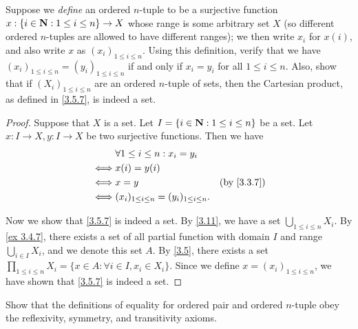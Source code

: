 \begin{exercise}\label{ex 3.5.2}
  Suppose we \emph{define} an ordered \(n\)-tuple to be a surjective function \(x : \{i \in \mathbf{N} : 1 \leq i \leq n\} \to X\) whose range is some arbitrary set \(X\) (so different ordered \(n\)-tuples are allowed to have different ranges);
  we then write \(x_i\) for \(x(i)\), and also write \(x\) as \((x_i)_{1 \leq i \leq n}\).
  Using this definition, verify that we have \((x_i)_{1 \leq i \leq n} = (y_i)_{1 \leq i \leq n}\) if and only if \(x_i = y_i\) for all \(1 \leq i \leq n\).
  Also, show that if \((X_i)_{1 \leq i \leq n}\) are an ordered \(n\)-tuple of sets, then the Cartesian product, as defined in \cref{3.5.7}, is indeed a set.
\end{exercise}

\begin{proof}
  Suppose that \(X\) is a set.
  Let \(I = \{i \in \mathbf{N} : 1 \leq i \leq n\}\) be a set.
  Let \(x : I \to X, y : I \to X\) be two surjective functions.
  Then we have
  \begin{align*}
         & \forall 1 \leq i \leq n : x_i = y_i                                           \\
    \iff & x(i) = y(i)                                                                   \\
    \iff & x = y                                              & \text{(by \cref{3.3.7})} \\
    \iff & (x_i)_{1 \leq i \leq n} = (y_i)_{1 \leq i \leq n}.
  \end{align*}

  Now we show that \cref{3.5.7} is indeed a set.
  By \cref{3.11}, we have a set \(\bigcup_{1 \leq i \leq n} X_i\).
  By \cref{ex 3.4.7}, there exists a set of all partial function with domain \(I\) and range \(\bigcup_{i \in I} X_i\), and we denote this set \(A\).
  By \cref{3.5}, there exists a set \(\prod_{1 \leq i \leq n} X_i = \{x \in A : \forall i \in I, x_i \in X_i\}\).
  Since we define \(x = (x_i)_{1 \leq i \leq n}\), we have shown that \cref{3.5.7} is indeed a set.
\end{proof}

\begin{exercise}\label{ex 3.5.3}
  Show that the definitions of equality for ordered pair and ordered \(n\)-tuple obey the reflexivity, symmetry, and transitivity axioms.
\end{exercise}


